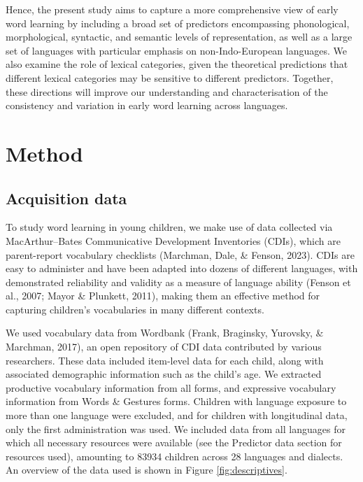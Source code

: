 \documentclass[10pt, letterpaper]{article}
\begin{document}
Hence, the present study aims to capture a more comprehensive view of
early word learning by including a broad set of predictors encompassing
phonological, morphological, syntactic, and semantic levels of
representation, as well as a large set of languages with particular
emphasis on non-Indo-European languages. We also examine the role of
lexical categories, given the theoretical predictions that different
lexical categories may be sensitive to different predictors. Together,
these directions will improve our understanding and characterisation of
the consistency and variation in early word learning across languages.

\hypertarget{method}{%
\section{Method}\label{method}}

\hypertarget{acquisition-data}{%
\subsection{Acquisition data}\label{acquisition-data}}

To study word learning in young children, we make use of data collected
via MacArthur--Bates Communicative Development Inventories (CDIs), which
are parent-report vocabulary checklists (Marchman, Dale, \& Fenson,
2023). CDIs are easy to administer and have been adapted into dozens of
different languages, with demonstrated reliability and validity as a
measure of language ability (Fenson et al., 2007; Mayor \& Plunkett,
2011), making them an effective method for capturing children's
vocabularies in many different contexts.

We used vocabulary data from Wordbank (Frank, Braginsky, Yurovsky, \&
Marchman, 2017), an open repository of CDI data contributed by various
researchers. These data included item-level data for each child, along
with associated demographic information such as the child's age. We
extracted productive vocabulary information from all forms, and
expressive vocabulary information from Words \& Gestures forms. Children
with language exposure to more than one language were excluded, and for
children with longitudinal data, only the first administration was used.
We included data from all languages for which all necessary resources
were available (see the Predictor data section for resources used),
amounting to 83934 children across 28 languages and dialects. An
overview of the data used is shown in Figure \ref{fig:descriptives}.
\end{document}
